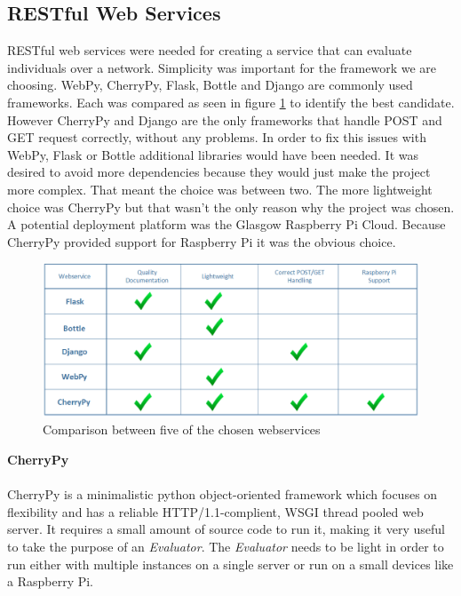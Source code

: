 \subsection{RESTful Web Services} 
RESTful web services were needed for creating a service that can evaluate individuals over a network. Simplicity was important for the framework we are
choosing. WebPy\cite{webpy}, CherryPy\cite{cherrypy}, Flask\cite{flask}, Bottle\cite{bottle} and Django\cite{django} are commonly used frameworks. Each was compared as seen in figure \ref{fig:webtab} to identify the best candidate. 
However CherryPy and Django are the only frameworks that handle POST and GET request correctly, without any problems. In order to fix this issues with WebPy, Flask\cite{flask} or Bottle\cite{bottle} additional
libraries would have been needed. It was desired to avoid more dependencies because they would just make the project more complex. That meant the choice was between two. The more lightweight
choice was CherryPy but that wasn't the only reason why the project was chosen. A potential deployment platform was the Glasgow Raspberry Pi Cloud\cite{picloud}. Because CherryPy provided support for Raspberry Pi\cite{raspi} it was the obvious choice.

\begin{figure}[htp]
\centering
\includegraphics[scale=0.6]{Figures/webtable.png}
\caption{Comparison between five of the chosen webservices}
\label{fig:webtab}
\end{figure}

\textbf{CherryPy}
\paragraph{}
CherryPy is a minimalistic python object-oriented framework which focuses on flexibility and has a reliable HTTP/1.1-complient, WSGI thread
pooled web server. It requires a small amount of source code to run it, making it very useful to take the purpose of an \textit{Evaluator}. The \textit{Evaluator}
needs to be light in order to run either with multiple instances on a single server or run on a small devices like a Raspberry Pi.

